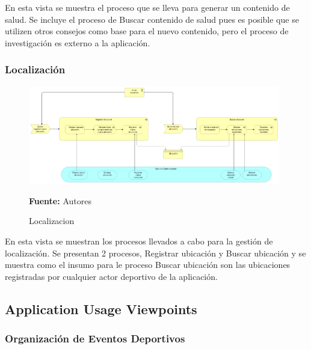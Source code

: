 En esta vista se muestra el proceso que se lleva para generar un contenido de salud. Se incluye el proceso de Buscar contenido de salud pues es posible que se utilizen otros consejos como base para el nuevo contenido, pero el proceso de investigación es externo a la aplicación.

\subsubsection{Localización}

\begin{figure}[!htb]
  \begin{center}
    \includegraphics[width=11cm]{./imagenes/Archimate/vistas/business_process/localizacion.png}
    \caption{Localizacion}
    \label{fig:BP_localizacion}
    \textbf{Fuente:}  Autores
  \end{center}
\end{figure}

En esta vista se muestran los procesos llevados a cabo para la gestión de localización. Se presentan 2 procesos, Registrar ubicación y Buscar ubicación y se muestra como el insumo para le proceso Buscar ubicación son las ubicaciones registradas por cualquier actor deportivo de la aplicación.

\subsection{Application Usage Viewpoints}

\subsubsection{Organización de Eventos Deportivos}

